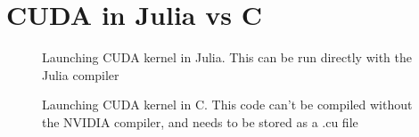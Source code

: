 
\chapter{CUDA in Julia vs C}
\label{app:jlscicomp}

\begin{figure}[h]
    \centering
    
    \caption{Launching CUDA kernel in Julia. This can be run directly with the Julia compiler}
    \label{fig:jlcuda}
\end{figure}
 
\begin{figure}[h]
    \centering
    
    \caption{Launching CUDA kernel in C. This code can't be compiled without the NVIDIA compiler, and needs to be stored as a .cu file}
    \label{fig:ccuda}
\end{figure}